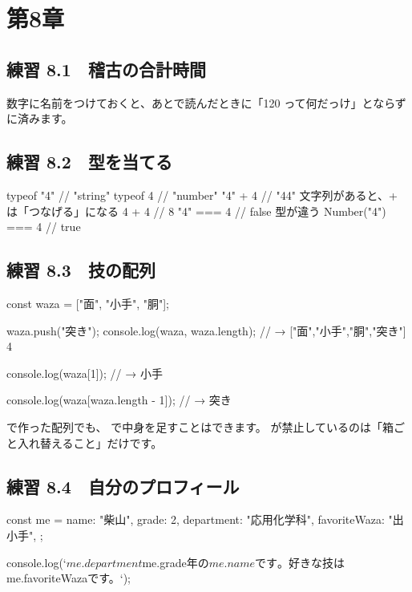 \section*{第8章}

\subsection*{練習 8.1　稽古の合計時間}
数字に名前をつけておくと、あとで読んだときに「120 って何だっけ」とならずに済みます。

\subsection*{練習 8.2　型を当てる}
\begin{Piton}[language=code]
typeof "4"          // "string"
typeof 4            // "number"
"4" + 4             // "44"   文字列があると、+ は「つなげる」になる
4 + 4               // 8
"4" === 4           // false  型が違う
Number("4") === 4   // true
\end{Piton}

\subsection*{練習 8.3　技の配列}
\begin{Piton}[language=code]
const waza = ["面", "小手", "胴"];

waza.push("突き");
console.log(waza, waza.length);          // → ["面","小手","胴","突き"] 4

console.log(waza[1]);                    // → 小手

console.log(waza[waza.length - 1]);      // → 突き
\end{Piton}
 で作った配列でも、 で中身を足すことはできます。 が禁止しているのは「箱ごと入れ替えること」だけです。

\subsection*{練習 8.4　自分のプロフィール}
\begin{Piton}[language=code]
const me = {
  name: "柴山",
  grade: 2,
  department: "応用化学科",
  favoriteWaza: "出小手",
};

console.log(`${me.department}${me.grade}年の${me.name}です。好きな技は${me.favoriteWaza}です。`);
\end{Piton}

